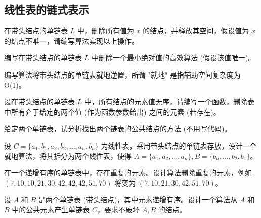 \subsection{线性表的链式表示}

\begin{qitems}

    \begin{bbox}
        \qitem 在带头结点的单链表 $L$ 中，删除所有值为 $x$ 的结点，并释放其空间，假设值为 $x$ 的结点不唯一，请编写算法实现以上操作。
    \end{bbox}

    \begin{bbox}
        \qitem 编写在带头结点的单链表 $L$ 中删除一个最小绝对值的高效算法 (假设该值唯一)。
    \end{bbox}

    \begin{bbox}
        \qitem 编写算法将带头结点的单链表就地逆置，所谓 "就地" 是指辅助空间复杂度为 O(1)。
    \end{bbox}

    \begin{bbox}
        \qitem 设在带头结点的单链表 $L$ 中，所有结点的元素值无序，请编写一个函数，删除表中所有介于给定的两个值 (作为函数参数给出) 之间的元素 (若存在)。
    \end{bbox}

    \begin{bbox}
        \qitem 给定两个单链表，试分析找出两个链表的公共结点的方法 (不用写代码)。
    \end{bbox}

    \begin{bbox}
        \qitem 设 $C = \{a_1, b_1, a_2, b_2, \dots, a_n, b_n\}$ 为线性表，采用带头结点的单链表存放，设计一个就地算法，将其拆分为两个线性表，使得 $A = \{a_1, a_2, \dots, a_n\}, B = \{b_n, \dots, b_2, b_1\}$。
    \end{bbox}

    \begin{bbox}
        \qitem 在一个递增有序的单链表中，存在重复的元素。设计算法删除重复的元素，例如 $(7, 10, 10, 21, 30, 42, 42, 42, 51, 70)$ 将变为 $(7, 10, 21, 30, 42, 51, 70)$。
    \end{bbox}

    \begin{bbox}
        \qitem 设 $A$ 和 $B$ 是两个单链表 (带头结点)，其中元素递增有序。设计一个算法从 $A$ 和 $B$ 中的公共元素产生单链表 $C$，要求不破坏 $A, B$ 的结点。
    \end{bbox}


\end{qitems}

